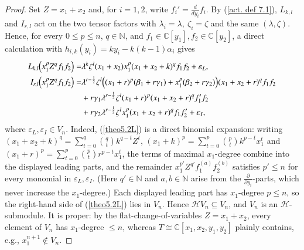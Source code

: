 \documentclass[12pt,reqno]{amsart}
\def\N{\mathbb{N}}
\def\C{\mathbb{C}}
\numberwithin{equation}{section}
\begin{document}
\begin{proof}
Set $Z=x_1+x_2$ and, for $i=1,2$, write $f_i'=\frac{d}{dy_i}f_i$. By
(\ref{act. def 7.1}), $L_{k,l}$ and $I_{r,l}$ act on the two tensor factors with
$\lambda_i=\lambda,\ \zeta_i=\zeta$ and the same $(\lambda,\zeta)$. Hence, for
every $0\le p\le n$, $q\in\N$, and $f_1\in\C[y_1], f_2\in\C[y_2]$, a direct
calculation with $h_{i,k}(y_i)=ky_i-k(k-1)\alpha_i$ gives
\begin{equation}\label{theo5.2L}
\begin{aligned}
L_{k,l}\Bigl(x_1^pZ^qf_1f_2\Bigr)
=&\lambda^k\zeta^l(x_1+x_2)x_1^p(x_1+x_2+k)^qf_1f_2+\varepsilon_L,\\
I_{r,l}\Bigl(x_1^pZ^qf_1f_2\Bigr)
=&\lambda^{r-\frac12}\zeta^l\Big(
   (x_1+r)^p(\beta_1+r\gamma_1)+x_1^p(\beta_2+r\gamma_2)\Big)(x_1+x_2+r)^qf_1f_2\\
&+r\gamma_1\lambda^{r-\frac12}\zeta^l(x_1+r)^p(x_1+x_2+r)^qf_1'f_2\\
&+r\gamma_2\lambda^{r-\frac12}\zeta^lx_1^p(x_1+x_2+r)^qf_1f_2'+\varepsilon_I,
\end{aligned}
\end{equation}
where $\varepsilon_L,\varepsilon_I\in V_n$. Indeed, (\ref{theo5.2L}) is a
direct binomial expansion: writing $(x_1+x_2+k)^q
=\sum_{t=0}^q\binom{q}{t}k^{q-t}Z^t$, $(x_1+k)^p
=\sum_{t=0}^p\binom{p}{t}k^{p-t}x_1^t$ and $(x_1+r)^p
=\sum_{t=0}^p\binom{p}{t}r^{p-t}x_1^t$, the terms of maximal $x_1$-degree
combine into the displayed leading parts, and the remainder
$x_1^{p'}Z^{q'}f_1^{(a)}f_2^{(b)}$ satisfies $p'\le n$ for every monomial
in $\varepsilon_L,\varepsilon_I$. (Here $q'\in\N$ and $a,b\in\N$ arise from
the $\frac{\partial}{\partial y_i}$-parts, which never increase the
$x_1$-degree.) Each displayed leading part has $x_1$-degree $p\le n$, so
the right-hand side of (\ref{theo5.2L}) lies in $V_n$. Hence
$\mathcal{H}V_n\subseteq V_n$, and $V_n$ is an $\mathcal{H}$-submodule.
It is proper: by the flat-change-of-variables $Z=x_1+x_2$, every element of
$V_n$ has $x_1$-degree $\le n$, whereas
$T\cong\C[x_1,x_2,y_1,y_2]$ plainly contains, e.g., $x_1^{n+1}\notin V_n$.


\end{proof}
\end{document}
